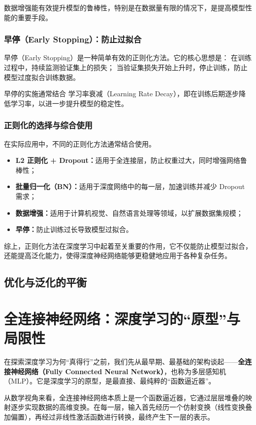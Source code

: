 数据增强能有效提升模型的鲁棒性，特别是在数据量有限的情况下，是提高模型性能的重要手段。

\subsubsection*{早停（Early Stopping）：防止过拟合}
早停（Early Stopping）是一种简单有效的正则化方法。它的核心思想是： 在训练过程中，持续监测验证集上的损失； 当验证集损失开始上升时，停止训练，防止模型过度拟合训练数据。

早停的实施通常结合 学习率衰减（Learning Rate Decay），即在训练后期逐步降低学习率，以进一步提升模型的稳定性。

\subsubsection*{ 正则化的选择与综合使用}
在实际应用中，不同的正则化方法通常结合使用。
\begin{itemize}
\item {\bf   L2 正则化 + Dropout：}适用于全连接层，防止权重过大，同时增强网络鲁棒性；
\item {\bf   批量归一化（BN）：}适用于深度网络中的每一层，加速训练并减少 Dropout 需求；
\item {\bf  数据增强：}适用于计算机视觉、自然语言处理等领域，以扩展数据集规模；
\item {\bf  早停：}防止训练过长导致模型过拟合。
\end{itemize}
综上，正则化方法在深度学习中起着至关重要的作用，它不仅能防止模型过拟合，还能提高泛化能力，使得深度神经网络能够更稳健地应用于各种复杂任务。
 
 \subsection{优化与泛化的平衡}
 

\section{全连接神经网络：深度学习的“原型”与局限性}
在探索深度学习为何“真得行”之前，我们先从最早期、最基础的架构谈起——{\bf 全连接神经网络（Fully Connected Neural Network）}，也称为多层感知机（MLP）。它是深度学习的原型，是最直接、最纯粹的“函数逼近器”。

从数学视角来看，全连接神经网络本质上是一个函数逼近器，它通过层层堆叠的映射逐步实现数据的高维变换。在每一层，输入首先经历一个仿射变换（线性变换叠加偏置），再经过非线性激活函数进行转换，最终产生下一层的表示。

